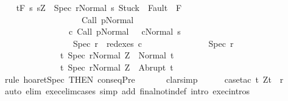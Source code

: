 \begin{isabellebody}
\ \ \isamarkupfalse%
\ {\isachardoublequoteopen}{\isasymGamma}{\isacharcomma}{\isasymTheta}{\isasymturnstile}\isactrlsub t\isactrlbsub {\isacharslash}F\isactrlesub \ {\isacharbraceleft}s{\isachardot}\ s{\isacharequal}Z\ {\isasymand}\ {\isasymGamma}{\isasymturnstile}{\isasymlangle}Spec\ r{\isacharcomma}Normal\ s{\isasymrangle}\ {\isasymRightarrow}{\isasymnotin}{\isacharparenleft}{\isacharbraceleft}Stuck{\isacharbraceright}\ {\isasymunion}\ Fault\ {\isacharbackquote}\ {\isacharparenleft}{\isacharminus}F{\isacharparenright}{\isacharparenright}\ {\isasymand}\ \isanewline
\ \ \ \ \ \ \ \ \ \ \ \ \ \ \ \ \ \ \ {\isasymGamma}{\isasymturnstile}Call\ p{\isasymdown}Normal\ {\isasymsigma}\ {\isasymand}\isanewline
\ \ \ \ \ \ \ \ \ \ \ \ \ \ \ \ {\isacharparenleft}{\isasymexists}c{\isacharprime}{\isachardot}\ {\isasymGamma}{\isasymturnstile}{\isacharparenleft}Call\ p{\isacharcomma}Normal\ {\isasymsigma}{\isacharparenright}\ {\isasymrightarrow}\isactrlsup {\isacharplus}\ {\isacharparenleft}c{\isacharprime}{\isacharcomma}Normal\ s{\isacharparenright}\ {\isasymand}\ \isanewline
\ \ \ \ \ \ \ \ \ \ \ \ \ \ \ \ \ Spec\ r\ {\isasymin}\ redexes\ c{\isacharprime}{\isacharparenright}{\isacharbraceright}\isanewline
\ \ \ \ \ \ \ \ \ \ \ \ \ \ \ Spec\ r\ \isanewline
\ \ \ \ \ \ \ \ \ \ \ \ \ \ {\isacharbraceleft}t{\isachardot}\ {\isasymGamma}{\isasymturnstile}{\isasymlangle}Spec\ r{\isacharcomma}Normal\ Z{\isasymrangle}\ {\isasymRightarrow}\ Normal\ t{\isacharbraceright}{\isacharcomma}\isanewline
\ \ \ \ \ \ \ \ \ \ \ \ \ \ {\isacharbraceleft}t{\isachardot}\ {\isasymGamma}{\isasymturnstile}{\isasymlangle}Spec\ r{\isacharcomma}Normal\ Z{\isasymrangle}\ {\isasymRightarrow}\ Abrupt\ t{\isacharbraceright}{\isachardoublequoteclose}\isanewline
\ \ \ \ \isamarkupfalse%
\ {\isacharparenleft}rule\ hoaret{\isachardot}Spec\ {\isacharbrackleft}THEN\ conseqPre{\isacharbrackright}{\isacharparenright}\ \isanewline
\ \ \ \ \isamarkupfalse%
\ {\isacharparenleft}clarsimp{\isacharparenright}\isanewline
\ \ \ \ \isamarkupfalse%
\ {\isacharparenleft}case{\isacharunderscore}tac\ {\isachardoublequoteopen}{\isasymexists}t{\isachardot}\ {\isacharparenleft}Z{\isacharcomma}t{\isacharparenright}\ {\isasymin}\ r{\isachardoublequoteclose}{\isacharparenright}\isanewline
\ \ \ \ \isamarkupfalse%
\ {\isacharparenleft}auto\ elim{\isacharcolon}\ exec{\isacharunderscore}elim{\isacharunderscore}cases\ simp\ add{\isacharcolon}\ final{\isacharunderscore}notin{\isacharunderscore}def\ intro{\isacharcolon}\ exec{\isachardot}intros{\isacharparenright}\isanewline

\end{isabellebody}
